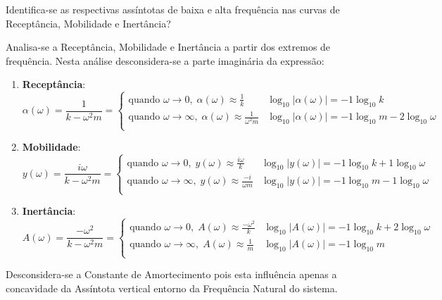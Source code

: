 \documentclass{article}
\begin{document}
\newpage
\begin{exercise}\label{ex5}
    Identifica-se as respectivas assíntotas de baixa e alta frequência nas curvas de Receptância, Mobilidade e Inertância?
\end{exercise}
\begin{resolution}
    Analisa-se a Receptância, Mobilidade e Inertância a partir dos extremos de frequência. Nesta análise desconsidera-se a parte imaginária da expressão:
    \begin{enumerate}
        \item \textbf{Receptância}:
        \begin{equation}
            \alpha(\omega) = \frac{1}{k - \omega^2m} = 
            \begin{cases}\nonumber
                \text{quando } \omega\to 0,     \;\alpha(\omega) \approx \frac{1}{k}         & \log_{10} |\alpha(\omega)| = -1\log_{10} k\\
                \text{quando } \omega\to \infty,\;\alpha(\omega) \approx \frac{1}{\omega^2m} & \log_{10} |\alpha(\omega)| = -1\log_{10} m -2\log_{10} \omega\\
            \end{cases}
        \end{equation}

        \item \textbf{Mobilidade}:
        \begin{equation}
            y(\omega) = \frac{i\omega}{k - \omega^2m} = 
            \begin{cases}\nonumber
                \text{quando } \omega\to 0,     \;y(\omega) \approx \frac{i\omega}{k}   & \log_{10} |y(\omega)| = -1\log_{10} k +1\log_{10} \omega \\
                \text{quando } \omega\to \infty,\;y(\omega) \approx \frac{-i}{\omega m} & \log_{10} |y(\omega)| = -1\log_{10} m -1\log_{10} \omega\\
            \end{cases}
        \end{equation}

        \item \textbf{Inertância}:
        \begin{equation}
            A(\omega) = \frac{-\omega^2}{k - \omega^2m} = 
            \begin{cases}\nonumber
                \text{quando } \omega\to 0,     \;A(\omega) \approx \frac{-\omega^2}{k} & \log_{10} |A(\omega)| = -1\log_{10} k +2\log_{10} \omega\\
                \text{quando } \omega\to \infty,\;A(\omega) \approx \frac{1}{m}         & \log_{10} |A(\omega)| = -1\log_{10} m\\
            \end{cases}
        \end{equation}
    \end{enumerate}
    Desconsidera-se a Constante de Amortecimento pois esta influência apenas a concavidade da Assíntota vertical entorno da Frequência Natural do sistema.\\


\end{resolution}
\end{document}
